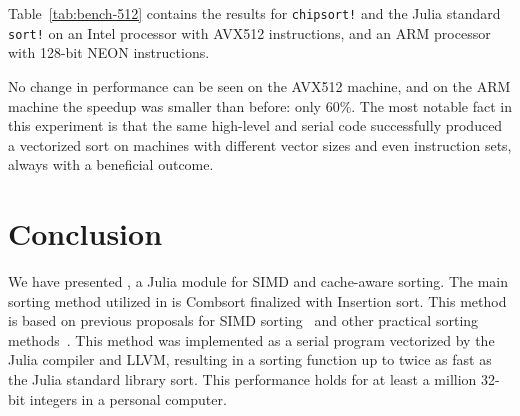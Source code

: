 \documentclass{juliacon}
\begin{document}
\begin{table}[h]
\label{tab:bench-cxx}
\end{table}

Table~\ref{tab:bench-512} contains the results for {\tt chipsort!} and the Julia standard {\tt sort!} on an Intel processor with AVX512 instructions, and an ARM processor with 128-bit NEON instructions.
\begin{table}[h]
\label{tab:bench-512}
\end{table}
No change in performance can be seen on the AVX512 machine, and on the ARM machine the speedup was smaller than before: only 60\%. The most notable fact in this experiment is that the same high-level and serial code successfully produced a vectorized sort on machines with different vector sizes and even instruction sets, always with a beneficial outcome.

\section{Conclusion}
\label{sec:conclusion}
%
We have presented \chipsort, a Julia module for SIMD and cache-aware sorting. The main sorting method utilized in \chipsort is Combsort finalized with Insertion sort. This method is based on previous proposals for SIMD sorting~\cite{DBLP:conf/IEEEpact/InoueMKN07,DBLP:journals/pvldb/InoueT15} and other practical sorting methods~\cite{INCERPI198737,musser1997introspective}. This method was implemented as a serial program vectorized by the Julia compiler and LLVM, resulting in a sorting function up to twice as fast as the Julia standard library sort. This performance holds for at least a million 32-bit integers in a personal computer.
\end{document}
